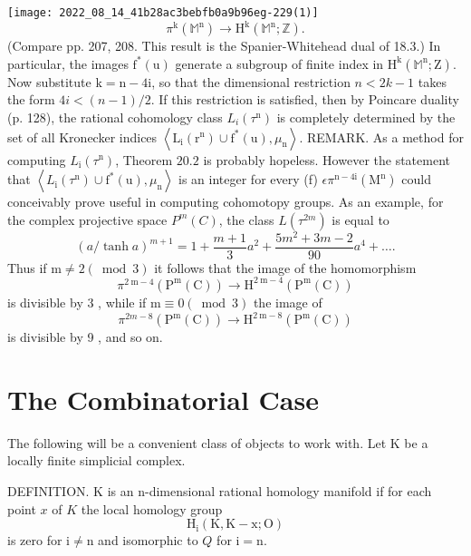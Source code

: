 \documentclass[10pt]{article}
\begin{document}
\texttt{[image: 2022\_08\_14\_41b28ac3bebfb0a9b96eg-229(1)]}
$$
\pi^{\mathrm{k}}\left(\mathbb{M}^{\mathrm{n}}\right) \rightarrow \mathrm{H}^{\mathrm{k}}\left(\mathbb{M}^{\mathrm{n}} ; \mathbb{Z}\right) .
$$
(Compare pp. 207, 208. This result is the Spanier-Whitehead dual of 18.3.) In particular, the images $\mathrm{f}^{*}(\mathrm{u})$ generate a subgroup of finite index in $\mathrm{H}^{\mathrm{k}}\left(\mathbb{M}^{\mathrm{n}} ; \mathrm{Z}\right)$. Now substitute $\mathrm{k}=\mathrm{n}-4 \mathrm{i}$, so that the dimensional restriction $n<2 k-1$ takes the form $4 i<(n-1) / 2$. If this restriction is satisfied, then by Poincare duality (p. 128), the rational cohomology class $L_{i}\left(\tau^{\mathrm{n}}\right)$ is completely determined by the set of all Kronecker indices $\left\langle\mathrm{L}_{\mathrm{i}}\left(\mathrm{r}^{\mathrm{n}}\right) \cup \mathrm{f}^{*}(\mathrm{u}), \mu_{\mathrm{n}}\right\rangle$. REMARK. As a method for computing $L_{\mathrm{i}}\left(\tau^{\mathrm{n}}\right)$, Theorem $20.2$ is probably hopeless. However the statement that $\left\langle L_{\mathrm{i}}\left(\tau^{\mathrm{n}}\right) \cup \mathrm{f}^{*}(\mathrm{u}), \mu_{\mathrm{n}}\right\rangle$ is an integer for every (f) $\epsilon \pi^{\mathrm{n}-4 \mathrm{i}}\left(\mathrm{M}^{\mathrm{n}}\right)$ could conceivably prove useful in computing cohomotopy groups. As an example, for the complex projective space $P^{m}(C)$, the class $L\left(\tau^{2 m}\right)$ is equal to
$$
(a / \tanh a)^{m+1}=1+\frac{m+1}{3} a^{2}+\frac{5 m^{2}+3 m-2}{90} a^{4}+\ldots .
$$
Thus if $\mathrm{m} \neq 2(\bmod 3)$ it follows that the image of the homomorphism
$$
\pi^{2 \mathrm{~m}-4}\left(\mathrm{P}^{\mathrm{m}}(\mathrm{C})\right) \rightarrow \mathrm{H}^{2 \mathrm{~m}-4}\left(\mathrm{P}^{\mathrm{m}}(\mathrm{C})\right)
$$
is divisible by 3 , while if $\mathrm{m} \equiv 0(\bmod 3)$ the image of
$$
\pi^{2 m-8}\left(\mathrm{P}^{\mathrm{m}}(\mathrm{C})\right) \rightarrow \mathrm{H}^{2 \mathrm{~m}-8}\left(\mathrm{P}^{\mathrm{m}}(\mathrm{C})\right)
$$
is divisible by 9 , and so on.

\section{The Combinatorial Case}
The following will be a convenient class of objects to work with. Let $\mathrm{K}$ be a locally finite simplicial complex.

DEFINITION. $\mathrm{K}$ is an $\mathrm{n}$-dimensional rational homology manifold if for each point $x$ of $K$ the local homology group
$$
\mathrm{H}_{\mathrm{i}}(\mathrm{K}, \mathrm{K}-\mathrm{x} ; \mathrm{O})
$$
is zero for $\mathrm{i} \neq \mathrm{n}$ and isomorphic to $Q$ for $\mathrm{i}=\mathrm{n}$.
\end{document}
